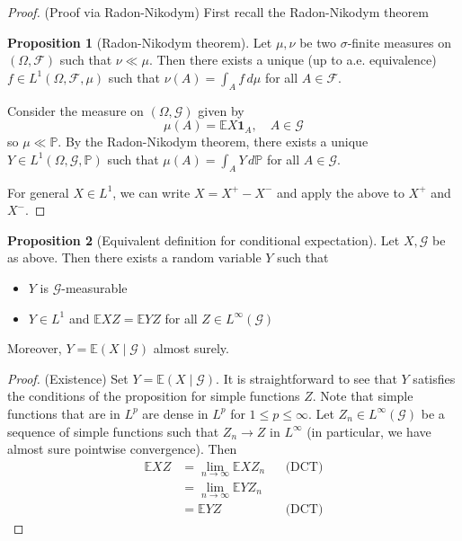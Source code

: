 \documentclass[parskip=full]{article}
\theoremstyle{definition}
\newtheorem{proposition}{Proposition}[section]
\newcommand{\Pbb}{\mathbb{P}}
\newcommand{\1}{\mathbbm{1}}
\newcommand{\E}{\mathbb{E}}
\begin{document}
\begin{proof}
  (Proof via Radon-Nikodym)
  First recall the Radon-Nikodym theorem
  \begin{proposition}[Radon-Nikodym theorem]
    Let $\mu, \nu$ be two $\sigma$-finite measures on $(\Omega, \mathcal{F})$ such that $\nu \ll \mu$. Then there exists a unique (up to a.e. equivalence) $f \in L^1(\Omega, \mathcal{F}, \mu)$ such that $\nu(A) = \int_A f \, d\mu$ for all $A \in \mathcal{F}$.
  \end{proposition}
  Consider the measure on $(\Omega, \mathcal{G})$ given by
  \[
    \mu(A) = \E X \mathbf{1}_A, \quad A \in \mathcal{G}
  \]
  so $\mu \ll \Pbb$. By the Radon-Nikodym theorem, there exists a unique $Y \in L^1(\Omega, \mathcal{G}, \Pbb)$ such that $\mu(A) = \int_A Y \, d\Pbb$ for all $A \in \mathcal{G}$.

  For general $X \in L^1$, we can write $X = X^+ - X^-$ and apply the above to $X^+$ and $X^-$.
\end{proof}

\begin{proposition}[Equivalent definition for conditional expectation]
  Let $X, \mathcal{G}$ be as above. Then there exists a random variable $Y$ such that
  \begin{itemize}
    \item $Y$ is $\mathcal{G}$-measurable
    \item $Y \in L^1$ and $\E X Z = \E Y Z$ for all $Z \in L^\infty(\mathcal{G})$
  \end{itemize}

  Moreover, $Y = \E(X \mid \mathcal{G})$ almost surely.
\end{proposition}

\begin{proof}
  (Existence)
  Set $Y = \E(X \mid \mathcal{G})$. It is straightforward to see that $Y$ satisfies the conditions of the proposition for simple functions $Z$. Note that simple functions that are in $L^p$ are dense in $L^p$ for $1 \leq p \leq \infty$. Let $Z_n \in L^\infty(\mathcal{G})$ be a sequence of simple functions such that $Z_n \to Z$ in $L^\infty$ (in particular, we have almost sure pointwise convergence). Then
  \begin{align*}
    \E X Z & = \lim_{n \to \infty} \E X Z_n &   & \text{(DCT)} \\
    &= \lim_{n \to \infty} \E Y Z_n\\
           & = \E Y Z                       &   & \text{(DCT)}
  \end{align*}
\end{proof}
\end{document}
